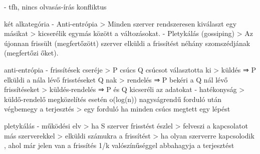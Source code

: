 \documentclass[twoside, a4paper, 12pt]{article}
\begin{document}
\begin{description}
                                                                        - tfh, nincs olvasás-írás konfliktus
                                                                    \item két alkategória
                                                                        - Anti-entrópia
                                                                        > Minden szerver rendszeresen kiválaszt egy másikat
                                                                        > kicserélik egymás között a változásokat.
                                                                        - Pletykálás (gossiping)
                                                                        > Az újonnan frissült (megfertőzött) szerver elküldi a frissítést néhány szomszédjának (megfertőzi őket).
                                                                    \item anti-entrópia
                                                                        - frissítések cseréje
                                                                        > P csúcs Q csúcsot választotta ki
                                                                        > küldés   ⇒ P elküldi a nála lévő frisstéseket Q nak
                                                                        > rendelés ⇒ P bekéri a Q nál lévő frissítéseket
                                                                        > küldés-rendelés ⇒ P és Q kicseréli az adatokat
                                                                        - hatékonyság
                                                                        > küldő-rendelő megközelítés esetén o(log(n)) nagyságrendű forduló után végbemegy a terjesztés
                                                                        > egy forduló ha minden csúcs megtett egy lépést
                                                                    \item pletykálás
                                                                        - működési elv
                                                                        > ha S szerver frisstést észlel
                                                                        > felveszi a kapcsolatot más szerverekkel 
                                                                        > elküldi számukra a frissítést
                                                                        > ha olyan szerverre kapcsolodik , ahol már jelen van a frissítés 1/k valószínűséggel abbahagyja a terjesztést

\end{description}
\end{document}
